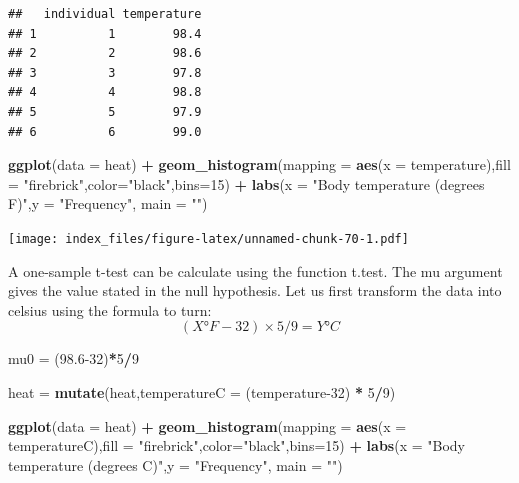 \documentclass[]{article}
\newenvironment{Shaded}{\begin{snugshade}}{\end{snugshade}}
\newcommand{\DataTypeTok}[1]{\textcolor[rgb]{0.13,0.29,0.53}{#1}}
\newcommand{\DecValTok}[1]{\textcolor[rgb]{0.00,0.00,0.81}{#1}}
\newcommand{\FloatTok}[1]{\textcolor[rgb]{0.00,0.00,0.81}{#1}}
\newcommand{\KeywordTok}[1]{\textcolor[rgb]{0.13,0.29,0.53}{\textbf{#1}}}
\newcommand{\NormalTok}[1]{#1}
\newcommand{\OperatorTok}[1]{\textcolor[rgb]{0.81,0.36,0.00}{\textbf{#1}}}
\newcommand{\StringTok}[1]{\textcolor[rgb]{0.31,0.60,0.02}{#1}}
\begin{document}
\begin{verbatim}
##   individual temperature
## 1          1        98.4
## 2          2        98.6
## 3          3        97.8
## 4          4        98.8
## 5          5        97.9
## 6          6        99.0
\end{verbatim}

\begin{Shaded}
\begin{Highlighting}[]
\KeywordTok{ggplot}\NormalTok{(}\DataTypeTok{data =}\NormalTok{ heat) }\OperatorTok{+}\StringTok{ }
\StringTok{  }\KeywordTok{geom_histogram}\NormalTok{(}\DataTypeTok{mapping =} \KeywordTok{aes}\NormalTok{(}\DataTypeTok{x =}\NormalTok{ temperature),}\DataTypeTok{fill =} \StringTok{"firebrick"}\NormalTok{,}\DataTypeTok{color=}\StringTok{"black"}\NormalTok{,}\DataTypeTok{bins=}\DecValTok{15}\NormalTok{) }\OperatorTok{+}\StringTok{ }
\StringTok{  }\KeywordTok{labs}\NormalTok{(}\DataTypeTok{x =} \StringTok{"Body temperature (degrees F)"}\NormalTok{,}\DataTypeTok{y =} \StringTok{"Frequency"}\NormalTok{, }\DataTypeTok{main =} \StringTok{""}\NormalTok{)}
\end{Highlighting}
\end{Shaded}

\texttt{[image: index\_files/figure-latex/unnamed-chunk-70-1.pdf]}

A one-sample t-test can be calculate using the function t.test. The mu
argument gives the value stated in the null hypothesis. Let us first
transform the data into celsius using the formula to turn:
\[(X °F − 32) × 5/9 = Y °C\]

\begin{Shaded}
\begin{Highlighting}[]
\NormalTok{mu0 =}\StringTok{ }\NormalTok{(}\FloatTok{98.6}\DecValTok{-32}\NormalTok{)}\OperatorTok{*}\DecValTok{5}\OperatorTok{/}\DecValTok{9}

\NormalTok{heat =}\StringTok{ }\KeywordTok{mutate}\NormalTok{(heat,}\DataTypeTok{temperatureC =}\NormalTok{ (temperature}\DecValTok{-32}\NormalTok{) }\OperatorTok{*}\StringTok{ }\DecValTok{5}\OperatorTok{/}\DecValTok{9}\NormalTok{)}

\KeywordTok{ggplot}\NormalTok{(}\DataTypeTok{data =}\NormalTok{ heat) }\OperatorTok{+}\StringTok{ }
\StringTok{  }\KeywordTok{geom_histogram}\NormalTok{(}\DataTypeTok{mapping =} \KeywordTok{aes}\NormalTok{(}\DataTypeTok{x =}\NormalTok{ temperatureC),}\DataTypeTok{fill =} \StringTok{"firebrick"}\NormalTok{,}\DataTypeTok{color=}\StringTok{"black"}\NormalTok{,}\DataTypeTok{bins=}\DecValTok{15}\NormalTok{) }\OperatorTok{+}\StringTok{ }
\StringTok{  }\KeywordTok{labs}\NormalTok{(}\DataTypeTok{x =} \StringTok{"Body temperature (degrees C)"}\NormalTok{,}\DataTypeTok{y =} \StringTok{"Frequency"}\NormalTok{, }\DataTypeTok{main =} \StringTok{""}\NormalTok{)}
\end{Highlighting}
\end{Shaded}
\end{document}
